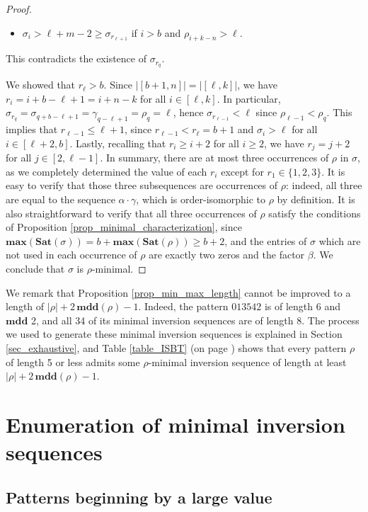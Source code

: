 \documentclass[a4paper,11pt]{article}
\theoremstyle{definition}
\theoremstyle{remark}
\renewcommand{\max}{\mathbf{max}}
\newcommand{\mdd}{\mathbf{mdd}}
\newcommand{\Sat}{\mathbf{Sat}}
\begin{document}
\begin{proof}
\begin{itemize}
\begin{itemize}
            \item $\sigma_i > \ell+m-2 \geq \sigma_{r_{\ell+1}}$ if $i > b$ and $\rho_{i+k-n} > \ell$.
        \end{itemize}
        This contradicts the existence of $\sigma_{r_q}$.
    \end{itemize}
    We showed that $r_\ell > b$. Since $|[b+1,n]| = |[\ell,k]|$, we have ${r_i = i+b-\ell+1 = i+n-k}$ for all $i \in [\ell,k]$. In particular, $\sigma_{r_q} = \sigma_{q+b-\ell+1} = \gamma_{q-\ell+1} = \rho_q = \ell$, hence ${\sigma_{r_{\ell-1}} < \ell}$ since ${\rho_{\ell-1} < \rho_q}$. This implies that $r_{\ell-1} \leq \ell+1$, since $r_{\ell-1} < r_\ell = b+1$ and $\sigma_i > \ell$ for all ${i \in [\ell+2,b]}$. Lastly, recalling that $r_i \geq i+2$ for all $i \geq 2$, we have ${r_j = j+2}$ for all $j \in [2,\ell-1]$. In summary, there are at most three occurrences of $\rho$ in $\sigma$, as we completely determined the value of each $r_i$ except for $r_1 \in \{1,2,3\}$. It is easy to verify that those three subsequences are occurrences of $\rho$: indeed, all three are equal to the sequence $\alpha \cdot \gamma$, which is order-isomorphic to $\rho$ by definition. It is also straightforward to verify that all three occurrences of $\rho$ satisfy the conditions of Proposition \ref{prop_minimal_characterization}, since ${\max(\Sat(\sigma)) = b+\max(\Sat(\rho)) \geq b+2}$, and the entries of $\sigma$ which are not used in each occurrence of $\rho$ are exactly two zeros and the factor $\beta$. We conclude that $\sigma$ is $\rho$-minimal.
\end{proof}
We remark that Proposition \ref{prop_min_max_length} cannot be improved to a length of ${|\rho| + 2 \, \mdd(\rho) - 1}$. Indeed, the pattern $013542$ is of length 6 and $\mdd$ 2, and all 34 of its minimal inversion sequences are of length 8. The process we used to generate these minimal inversion sequences is explained in Section \ref{sec_exhaustive}, and Table \ref{table_ISBT} (on page \pageref{table_ISBT}) shows that every pattern $\rho$ of length 5 or less admits some $\rho$-minimal inversion sequence of length at least ${|\rho| + 2 \, \mdd(\rho) - 1}$.

\section{Enumeration of minimal inversion sequences} \label{sec_enumeration}

\subsection{Patterns beginning by a large value} \label{sec_colours}
\end{document}
